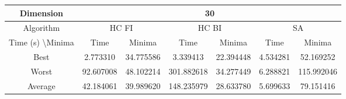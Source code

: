 \documentclass{article}
\begin{document}
\begin{table}[H]
\begin{tabular}{|c|c|c|c|c|c|c|}
\hline
Dimension                      & \multicolumn{6}{c|}{30}                                                           \\ \hline
Algorithm                      & \multicolumn{2}{c|}{HC FI} & \multicolumn{2}{c|}{HC BI} & \multicolumn{2}{c|}{SA} \\ \hline
Time (s) \textbackslash Minima & Time         & Minima      & Time         & Minima      & Time      & Minima      \\ \hline
Best                           & 2.773310     & 34.775586   & 3.339413     & 22.394448   & 4.534281  & 52.169252   \\ \hline
Worst                          & 92.607008    & 48.102214   & 301.882618   & 34.277449   & 6.288821  & 115.992046  \\ \hline
Average                        & 42.184061    & 39.989620   & 148.235979   & 28.633780   & 5.699633  & 79.151416   \\ \hline
\end{tabular}
\end{table}

\newpage
\end{document}
